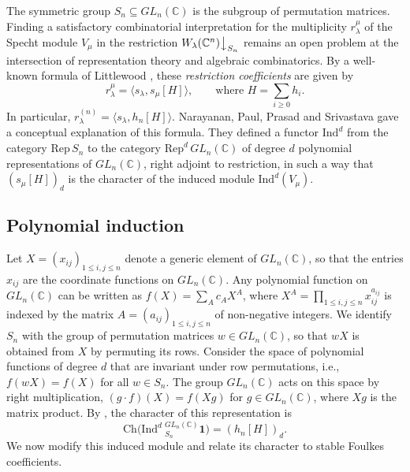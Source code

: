 \documentclass[reqno]{amsart}
\theoremstyle{plain}
\theoremstyle{definition}
\theoremstyle{remark}
\theoremstyle{plain}
\newcommand{\C}{\mathbb{C}}
\begin{document}
The symmetric group $S_n\subseteq GL_n(\C)$ is the subgroup of permutation
matrices. Finding a satisfactory combinatorial interpretation for the
multiplicity $r_\lambda^\mu$ of the Specht module $V_\mu$ in the restriction
$W_\lambda(\C^n)\big\downarrow_{S_n}$ remains an open problem at the
intersection of representation theory and algebraic combinatorics. By a
well-known formula of Littlewood \cite{littlewood}, these \emph{restriction
coefficients} are given by
$$r_\lambda^\mu=\langle s_\lambda,s_\mu[H]\rangle,\qquad\text{where } H=\sum_{i\geq 0}h_i.$$
In particular, $r_\lambda^{(n)}=\langle s_\lambda,h_n[H]\rangle$.
Narayanan, Paul, Prasad and Srivastava \cite{narayanan} gave a conceptual
explanation of this formula. They defined a functor $\mathrm{Ind}^d$ from the
category $\mathrm{Rep}\,S_n$ to the category $\mathrm{Rep}^d\,GL_n(\C)$ of
degree $d$ polynomial representations of $GL_n(\C)$, right adjoint to
restriction, in such a way that $(s_\mu[H])_d$ is the character of the induced
module $\mathrm{Ind}^d(V_\mu)$.

\subsection{Polynomial induction}
Let $X=(x_{ij})_{1\le i,j\le n}$ denote a generic element of $GL_n(\C)$, so
that the entries $x_{ij}$ are the coordinate functions on $GL_n(\C)$. Any
polynomial function on $GL_n(\C)$ can be written as $f(X)=\sum_{A}c_AX^A$,
where $X^A=\prod_{1\leq i,j\leq n}x_{ij}^{a_{ij}}$ is indexed by the matrix
$A=(a_{ij})_{1\leq i,j\leq n}$ of non-negative integers. We identify $S_n$
with the group of permutation matrices $w\in GL_n(\C)$, so that $wX$ is
obtained from $X$ by permuting its rows. Consider the space of polynomial
functions of degree $d$ that are invariant under row permutations, i.e.,
$f(wX)=f(X)$ for all $w\in S_n$. The group $GL_n(\C)$ acts on this space by
right multiplication, $(g\cdot f)(X)=f(Xg)$ for $g\in GL_n(\C)$, where $Xg$
is the matrix product. By \cite[Theorem~4.7]{narayanan}, the character of this
representation is
$$\mathrm{Ch}\big(\mathrm{Ind}^d\ _{S_n}^{GL_n(\C)}\mathbf{1}\big)=(h_n[H])_d.$$
We now modify this induced module and relate its character to stable Foulkes
coefficients.
\end{document}
